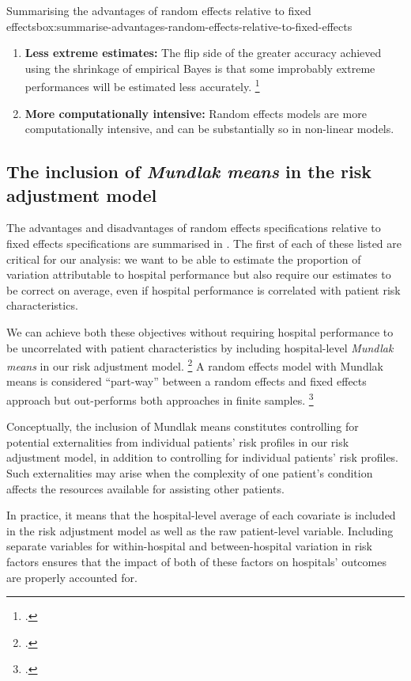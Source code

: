 \documentclass[submission]{grattan}
\begin{document}
\begin{bigbox*}{Summarising the advantages of random effects relative to fixed effects}{box:summarise-advantages-random-effects-relative-to-fixed-effects}
\begin{enumerate}
\item \textbf{Less extreme estimates:} The flip side of the greater accuracy achieved using the shrinkage of empirical Bayes is that some improbably extreme performances will be estimated less accurately.%
  \footcite{Kalbfleisch_2013}

\item \textbf{More computationally intensive:} Random effects models are more computationally intensive, and can be substantially so in non-linear models.
\end{enumerate}
\end{bigbox*}

\subsection{The inclusion of \textit{Mundlak means} in the risk adjustment model}\label{subsec:the-inclusion-of-mundlak-means-in-the-risk-adjustment-model}

The advantages and disadvantages of random effects specifications relative to fixed effects specifications are summarised in .
The first of each of these listed are critical for our analysis: we want to be able to estimate the proportion of variation attributable to hospital performance but also require our estimates to be correct on average, even if hospital performance is correlated with patient risk characteristics.

We can achieve both these objectives without requiring hospital performance to be uncorrelated with patient characteristics by including hospital-level \emph{Mundlak means} in our risk adjustment model.%
	\footcites{Bafumi-Gelman-2006}{bell_jones_2015-explaining-fixed-effects}
A random effects model with Mundlak means is considered ``part-way'' between a random effects and fixed effects approach but out-performs both approaches in finite samples.%
	\footcites{Ash-etal-2012-Stats-issues-assessing-hospital-perf}{Dieleman_2016}

Conceptually, the inclusion of Mundlak means constitutes controlling for potential externalities from individual patients' risk profiles in our risk adjustment model, in addition to controlling for individual patients' risk profiles.
Such externalities may arise when the complexity of one patient's condition affects the resources available for assisting other patients.

In practice, it means that the hospital-level average of each covariate is included in the risk adjustment model as well as the raw patient-level variable.
Including separate variables for within-hospital and between-hospital variation in risk factors ensures that the impact of both of these factors on hospitals' outcomes are properly accounted for.
\end{document}
